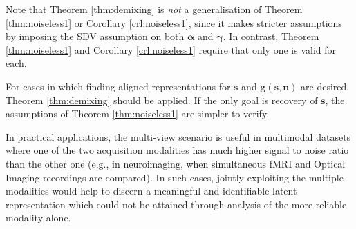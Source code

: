 Note that Theorem \ref{thm:demixing} is \emph{not} a generalisation of Theorem \ref{thm:noiseless1} or Corollary \ref{crl:noiseless1}, since it makes stricter assumptions by imposing the SDV assumption on both $\bm{\alpha}$ and $\bm{\gamma}$.
In contrast, Theorem \ref{thm:noiseless1} and Corollary \ref{crl:noiseless1} require that only one is valid for each.

For cases in which finding aligned representations for $\bm{s}$ and $\bm{g}(\bm{s}, \bm{n})$ are desired, Theorem \ref{thm:demixing} should be applied.
If the only goal is recovery of $\bm{s}$, the assumptions of Theorem \ref{thm:noiseless1} are simpler to verify.


In practical applications, the multi-view scenario is useful in multimodal datasets where one of the two acquisition modalities has much higher signal to noise ratio than the other one (e.g., in neuroimaging, when simultaneous fMRI and Optical Imaging recordings are compared). In such cases, jointly exploiting the multiple modalities would help to discern a meaningful and identifiable latent representation which could not be attained through analysis of the more reliable modality alone.



